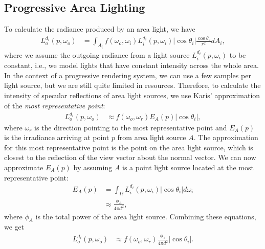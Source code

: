 \documentclass[sigconf,authorversion]{acmart}
\begin{document}
\subsection{Progressive Area Lighting}
To calculate the radiance produced by an area light, we have
\begin{align}
    L_o^{d_i}(p, \omega_o) &= \int_{A_i} f(\omega_o, \omega_i) L_i^{d_i}(p, \omega_i) \left|\cos \theta_i\right| \frac{\cos \theta_o}{r^2} dA_i,
\end{align}
where we assume the outgoing radiance from a light source $L_i^{d_i}(p, \omega_i)$ to be constant, i.e., we model lights that have constant intensity across the whole area.
In the context of a progressive rendering system, we can use a few samples per light source, but we are still quite limited in resources.
Therefore, to calculate the intensity of specular reflections of area light sources, we use Karis' \cite{karis2013real} approximation of the \textit{most representative point}:
\begin{align}
    L_o^{d_i}(p, \omega_o) &\approx f(\omega_o, \omega_r) E_A(p) \left|\cos \theta_i\right|,
\end{align}
where $\omega_r$ is the direction pointing to the most representative point and $E_A(p)$ is the irradiance arriving at point $p$ from area light source $A$.
The approximation for this most representative point is the point on the area light source, which is closest to the reflection of the view vector about the normal vector.
We can now approximate $E_A(p)$ by assuming $A$ is a point light source located at the most representative point:
\begin{align}
    E_A(p) &= \int_\Omega L_i^{d_i}(p, \omega_i) \left|\cos \theta_i\right| d\omega_i\\
    &\approx \frac{\phi_A}{4 \pi d^2},
\end{align}
where $\phi_A$ is the total power of the area light source.
Combining these equations, we get
\begin{align}
    L_o^{d_i}(p, \omega_o) &\approx f(\omega_o, \omega_r) \frac{\phi_A}{4 \pi d^2} \left|\cos \theta_i\right| \label{math:direct_light_approx}.
\end{align}
\end{document}
